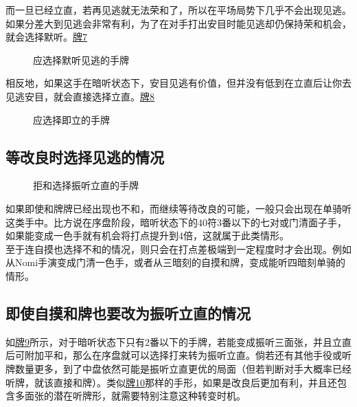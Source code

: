 而一旦已经立直，若再见逃就无法荣和了，所以在平场局势下几乎不会出现见逃。如果分差大到见逃会非常有利，为了在对手打出安目时能见逃却仍保持荣和机会，就会选择默听。\hyperref[lec4:pai7]{牌7}

\begin{figure}[h]
    \caption{应选择默听见逃的手牌}
    \label{lec4:pai7}
\end{figure}

相反地，如果这手在暗听状态下，安目见逃有价值，但并没有低到在立直后让你去见逃安目，就会直接选择立直。\hyperref[lec4:pai8]{牌8}
\begin{figure}[h]
    \caption{应选择即立的手牌}
    \label{lec4:pai8}
\end{figure}

\subsection{等改良时选择见逃的情况}
\begin{figure}
    \caption{拒和选择振听立直的手牌}
    \label{lec4:pai9-10}
    \par\bigskip
\end{figure}

如果即使和牌牌已经出现也不和，而继续等待改良的可能，一般只会出现在单骑听这类手中。比方说在序盘阶段，暗听状态下的40符3番以下的七对或门清面子手，如果能变成一色手就有机会将打点提升到4倍，这就属于此类情形。\\
至于连自摸也选择不和的情况，则只会在打点差极端到一定程度时才会出现。例如从Nomi手演变成门清一色手，或者从三暗刻的自摸和牌，变成能听四暗刻单骑的情形。

\subsection{即使自摸和牌也要改为振听立直的情况}
如\hyperref[lec4:pai9-10]{牌9}所示，对于暗听状态下只有2番以下的手牌，若能变成振听三面张，并且立直后可附加平和，那么在序盘就可以选择打来转为振听立直。倘若还有其他手役或听牌数量更多，到了中盘依然可能是振听立直更优的局面（但若判断对手大概率已经听牌，就该直接和牌）。类似\hyperref[lec4:pai9-10]{牌10}那样的手形，如果是改良后更加有利，并且还包含多面张的潜在听牌形，就需要特别注意这种转变时机。
